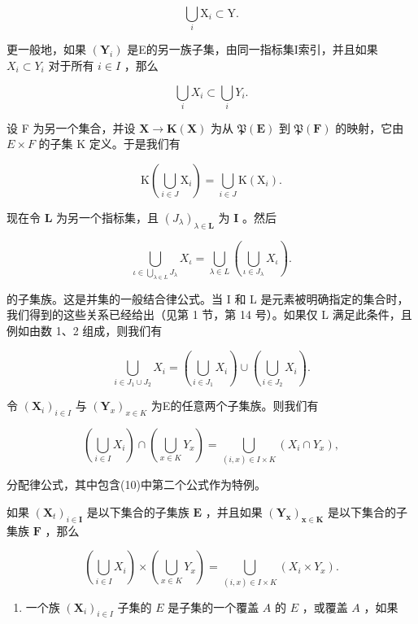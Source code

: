 \[
\bigcup_ {i} \mathrm{X} _ {i} \subset \mathrm{Y}.
\]

更一般地，如果 \((\mathbf{Y}_{i})\) 是E的另一族子集，由同一指标集I索引，并且如果 \(X_{i} \subset Y_{i}\) 对于所有 \(i \in I\) ，那么

\[
\bigcup_ {i} X _ {i} \subset \bigcup_ {i} Y _ {i}.
\]

设 F 为另一个集合，并设 \(\mathbf{X} \to \mathbf{K}(\mathbf{X})\) 为从 \(\mathfrak{P}(\mathbf{E})\) 到 \(\mathfrak{P}(\mathbf{F})\) 的映射，它由 \(E \times F\) 的子集 K 定义。于是我们有

\[
\mathrm{K} \left(\bigcup_ {i \in J} \mathrm{X} _ {i}\right) = \bigcup_ {i \in J} \mathrm{K} (\mathrm{X} _ {i}).\tag{34}
\]

现在令 \(\mathbf{L}\) 为另一个指标集，且 \((J_{\lambda})_{\lambda \in \mathbf{L}}\) 为 \(\mathbf{I}\) 。然后

\[
\bigcup_ {\iota \in \bigcup_ {\lambda \in L} J _ {\lambda}} X _ {\iota} = \bigcup_ {\lambda \in L} \left(\bigcup_ {\iota \in J _ {\lambda}} X _ {\iota}\right).\tag{35}
\]

的子集族。这是并集的一般结合律公式。当 I 和 L 是元素被明确指定的集合时，我们得到的这些关系已经给出（见第 1 节，第 14 号）。如果仅 L 满足此条件，且例如由数 1、2 组成，则我们有

\[
\bigcup_ {i \in J _ {1} \cup J _ {2}} X _ {i} = \left(\bigcup_ {i \in J _ {1}} X _ {i}\right) \cup \left(\bigcup_ {i \in J _ {2}} X _ {i}\right).\tag{36}
\]

令 \((\mathbf{X}_i)_{i\in I}\) 与 \((\mathbf{Y}_x)_{x\in K}\) 为E的任意两个子集族。则我们有

\[
\left(\bigcup_ {i \in I} X _ {i}\right) \cap \left(\bigcup_ {x \in K} Y _ {x}\right) = \bigcup_ {(i, x) \in I \times K} (X _ {i} \cap Y _ {x}),\tag{37}
\]

分配律公式，其中包含(10)中第二个公式作为特例。

如果 \((\mathbf{X}_t)_{i\in \mathbf{I}}\) 是以下集合的子集族 \(\mathbf{E}\) ，并且如果 \((\mathbf{Y}_{\mathbf{x}})_{\mathbf{x}\in \mathbf{K}}\) 是以下集合的子集族 \(\mathbf{F}\) ，那么

\[
\left(\bigcup_ {i \in I} X _ {i}\right) \times \left(\bigcup_ {x \in K} Y _ {x}\right) = \bigcup_ {(i, x) \in I \times K} (X _ {i} \times Y _ {x}).\tag{38}
\]

\begin{enumerate}
\def\labelenumi{\arabic{enumi}.}
\setcounter{enumi}{3}
\tightlist
\item
  一个族 \((\mathbf{X}_i)_{i\in I}\) 子集的 \(E\) 是子集的一个覆盖 \(A\) 的 \(E\) ，或覆盖 \(A\) ，如果
\end{enumerate}

